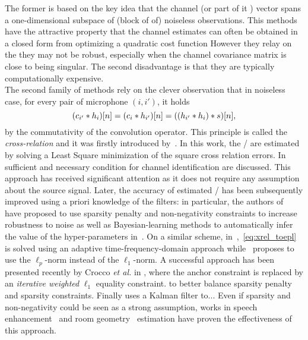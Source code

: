 The former is based on the key idea that the channel (or part of it ) vector spans a one-dimensional subspace of (block of of) noiseless observations.
This methods have the attractive property that the channel estimates can often be obtained in a closed form from optimizing a quadratic cost function
However they relay on the they may not be robust, especially when the channel covariance matrix is close to being singular.
The second disadvantage is that they are typically computationally expensive.
\\The second family of methods rely on the clever observation that in noiseless case, for every pair of microphone $(i, i')$, it holds
\begin{equation}
    (c_{i'} \ast h_i)[n] = (c_{i} \ast h_{i'})[n] =  ((h_{i'} \ast h_i) \ast s)[n]
    ,
\end{equation}
by the commutativity of the convolution operator.
This principle is called the \textit{cross-relation} and it was firstly introduced by~.
In this work, the \RIR/ are estimated by solving a Least Square minimization of the square cross relation errors.
In  sufficient and necessary condition for channel identification are discussed.
This approach has received significant attention as it does not require any assumption about the source signal.
Later, the accuracy of estimated \RIRs/ has been subsequently improved using a priori knowledge of the filters:
in particular, the authors of~ have proposed to use sparsity penalty and non-negativity constraints to increase robustness to noise as well as Bayesian-learning methods to automatically infer the value of the hyper-parameters in~.
On a similar scheme, in~,~\eqref{eq:xrel_toepl} is solved using an adaptive time-frequency-domain approach while~ proposes to use the $\ell_p$-norm instead of the $\ell_1$-norm.
A successful approach has been presented recently by Crocco \textit{et al.} in , where the anchor constraint is replaced by an \textit{iterative weighted} $\ell_1$ equality constraint.
to better balance sparsity penalty and sparsity constraints.
Finally  uses a Kalman filter to...
Even if sparsity and non-negativity could be seen as a strong assumption, works in speech enhancement~ and room geometry~ estimation have proven the effectiveness of this approach.

